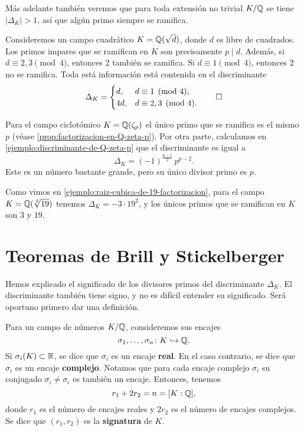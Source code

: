 Más adelante también veremos que para toda extensión no trivial $K/\mathbb{Q}$ se tiene
$|\Delta_K| > 1$, así que algún primo siempre se ramifica.

\begin{ejemplo}
  Consideremos un campo cuadrático $K = \mathbb{Q} (\sqrt{d})$, donde $d$ es libre de
  cuadrados. Los primos impares que se ramifican en $K$ son precisamente
  $p \mid d$. Además, si $d \equiv 2,3\pmod{4}$, entonces $2$ también se
  ramifica. Si $d \equiv 1\pmod{4}$, entonces $2$ no se ramifica. Toda está
  información está contenida en el discriminante
  \[ \Delta_K = \begin{cases}
    d, & d \equiv 1 \pmod{4}, \\
    4d, & d \equiv 2,3 \pmod{4}.
  \end{cases} \qedhere \]
\end{ejemplo}

\begin{ejemplo}
  Para el campo ciclotómico $K = \mathbb{Q} (\zeta_p)$ el único primo que se ramifica
  es el mismo $p$ (véase \ref{prop:factorizacion-en-Q-zeta-p}). Por otra parte,
  calculamos en \ref{ejemplo:discriminante-de-Q-zeta-p} que el discriminante
  es igual a
  $$\Delta_K = (-1)^{\frac{p-1}{2}}\,p^{p-2}.$$
  Este es un número bastante grande, pero su único divisor primo es $p$.
\end{ejemplo}

\begin{ejemplo}
  Como vimos en \ref{ejemplo:raiz-cubica-de-19-factorizacion}, para el campo
  $K = \mathbb{Q} (\sqrt[3]{19})$ tenemos $\Delta_K = -3\cdot 19^2$, y los únicos
  primos que se ramifican en $K$ son $3$ y $19$.
\end{ejemplo}


\section{Teoremas de Brill y Stickelberger}

Hemos explicado el significado de los divisores primos del discriminante
$\Delta_K$. El discriminante también tiene signo, y no es difícil entender su
significado. Será oportuno primero dar una definición.

\begin{definicion}
  Para un campo de números $K/\mathbb{Q}$, consideremos sus encajes
  $$\sigma_1, \ldots, \sigma_n\colon K \hookrightarrow \mathbb{Q}.$$
  Si $\sigma_i (K) \subset \mathbb{R}$, se dice que $\sigma_i$ es un encaje
  \textbf{real}. En el caso contrario, se dice que $\sigma_i$ es un encaje
  \textbf{complejo}. Notamos que para cada encaje complejo $\sigma_i$
  su conjugado $\overline{\sigma_i} \ne \sigma_i$ es también un encaje.
  Entonces, tenemos
  $$r_1 + 2 r_2 = n = [K : \mathbb{Q}],$$
  donde $r_1$ es el número de encajes reales y $2 r_2$ es el número de encajes
  complejos. Se dice que $(r_1, r_2)$ es la \textbf{signatura} de $K$.
\end{definicion}

